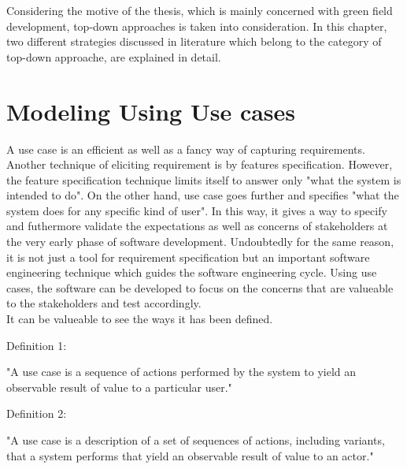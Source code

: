 Considering the motive of the thesis, which is mainly concerned with green field development, top-down approaches is taken into consideration. In this chapter, two different strategies discussed in literature which belong to the category of top-down approache, are explained in detail.

\section{Modeling Using Use cases}\label{section:selection_by_use_case/use_case}
A use case is an efficient as well as a fancy way of capturing requirements. Another technique of eliciting requirement is by features specification. However, the feature specification technique limits itself to answer only "what the system is intended to do". On the other hand, use case goes further and specifies "what the system does for any specific kind of user". In this way, it gives a way to specify and futhermore validate the expectations as well as concerns of stakeholders at the very early phase of software development. Undoubtedly for the same reason, it is not just a tool for requirement specification but an important software engineering technique which guides the software engineering cycle. Using use cases, the software can be developed to focus on the concerns that are valueable to the stakeholders and test accordingly.\cite{Ng:2004aa}
\\
It can be valueable to see the ways it has been defined.
\begin{shaded}Definition 1: \cite{Jacobson:1987aa} \end{shaded}
"A use case is a sequence of actions performed by the system to yield an observable result of value to a particular user." 
\\
\begin{shaded}Definition 2: \cite{Rumbaugh:1999aa}\end{shaded}
"A use case is a description of a set of sequences of actions, including variants, that a system performs that yield an observable result of value to an actor."

